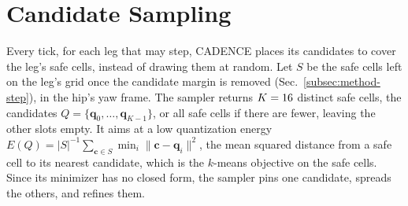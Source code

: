 \section{Candidate Sampling}
\label{app:sampler}

 Every tick, for each leg that may step, CADENCE places
its candidates to cover the leg's safe cells, instead of drawing them at
random. Let $S$ be the safe cells left on the leg's grid once the
candidate margin is removed (Sec.~\ref{subsec:method-step}), in the
hip's yaw frame. The sampler returns $K =
16$ distinct safe cells, the candidates $Q =
\{\mathbf q_0, \dots, \mathbf q_{K-1}\}$, or all safe cells if there are
fewer, leaving the other slots empty. It aims at a low quantization
energy $E(Q) = |S|^{-1} \sum_{\mathbf c \in S} \min_i \|\mathbf c -
\mathbf q_i\|^2$, the mean squared distance from a safe cell to its
nearest candidate, which is the $k$-means objective on the safe cells.
Since its minimizer has no closed form, the sampler pins one candidate,
spreads the others, and refines them.

